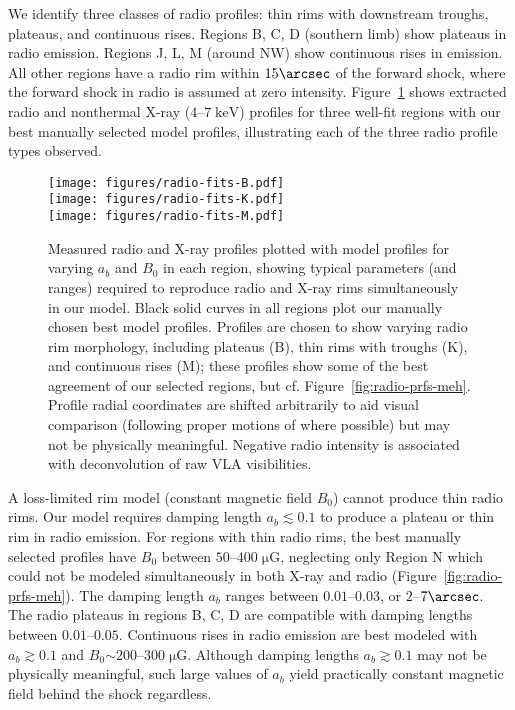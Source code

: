 \documentclass[manuscript]{aastex}  %
\newcommand*{\mt}{\mathrm}
\newcommand*{\unit}[1]{\;\mt{#1}}  %
\newcommand*{\abt}{\mathord{\sim}} %
\newcommand*{\muG}{\unit{\mu G}}
\begin{document}
We identify three classes of radio profiles: thin rims with downstream troughs,
plateaus, and continuous rises.  Regions B, C, D (southern limb) show plateaus
in radio emission.  Regions J, L, M (around NW) show continuous rises in
emission.  All other regions have a radio rim within $15\arcsec$ of the forward
shock, where the forward shock in radio is assumed at zero intensity.
Figure~\ref{fig:radio-prfs} shows extracted radio and nonthermal X-ray
($4$--$7\unit{keV}$) profiles for three well-fit regions with our best manually
selected model profiles, illustrating each of the three radio profile types
observed.

\begin{figure}
    \centering
    \texttt{[image: figures/radio-fits-B.pdf]} \\
    \texttt{[image: figures/radio-fits-K.pdf]} \\
    \texttt{[image: figures/radio-fits-M.pdf]}
    \caption{Measured radio and X-ray profiles plotted with model profiles for
    varying $a_b$ and $B_0$ in each region, showing typical parameters (and
    ranges) required to reproduce radio and X-ray rims simultaneously in our
    model.  Black solid curves in all regions plot our manually chosen best
    model profiles.  Profiles are chosen to show varying radio rim morphology,
    including plateaus (B), thin rims with troughs (K), and continuous rises
    (M); these profiles show some of the best agreement of our selected
    regions, but cf. Figure~\ref{fig:radio-prfs-meh}.  Profile radial
    coordinates are shifted arbitrarily to aid visual comparison (following
    proper motions of \citet{katsuda2010-tycho} where possible) but may not be
    physically meaningful.  Negative radio intensity is associated with
    deconvolution of raw VLA visibilities.
    \label{fig:radio-prfs}}
\end{figure}

A loss-limited rim model (constant magnetic field $B_0$) cannot produce thin
radio rims.  Our model requires damping length $a_b \lesssim 0.1$ to produce a
plateau or thin rim in radio emission.  For regions with thin radio rims, the
best manually selected profiles have $B_0$ between $50$--$400 \muG$, neglecting
only Region N which could not be modeled simultaneously in both X-ray and radio
(Figure~\ref{fig:radio-prfs-meh}).  The damping length $a_b$ ranges between
$0.01$--$0.03$, or $2$--$7\arcsec$.  The radio plateaus in regions B, C, D are
compatible with damping lengths between $0.01$--$0.05$.  Continuous rises in
radio emission are best modeled with $a_b \gtrsim 0.1$ and $B_0 \abt 200$--$300
\muG$.  Although damping lengths $a_b \gtrsim 0.1$ may not be physically
meaningful, such large values of $a_b$ yield practically constant magnetic
field behind the shock regardless.
\end{document}
